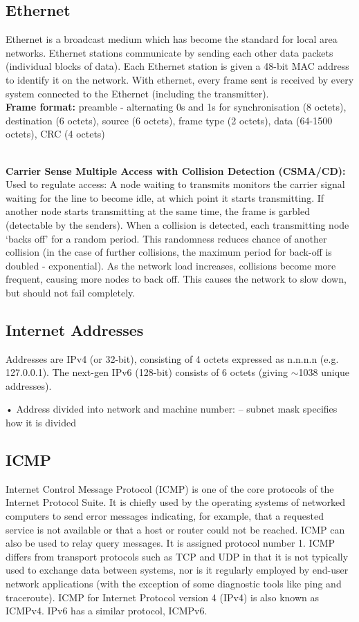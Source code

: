 \documentclass[a4paper,oneside]{report}
\begin{document}
    	\subsection{Ethernet}
    	Ethernet is a broadcast medium which has become the standard for local area networks. Ethernet stations communicate by sending each other data packets (individual blocks of data). Each Ethernet station is given a 48-bit MAC address to identify it on the network. With ethernet, every frame sent is received by every system connected to the Ethernet (including the transmitter).\\
    	
\noindent\textbf{Frame format:}
preamble - alternating 0s and 1s for synchronisation (8 octets), destination (6 octets), source (6 octets), frame type (2 octets), data (64-1500 octets), CRC (4 octets)
    	    	
\ \\ \textbf{Carrier Sense Multiple Access with Collision Detection (CSMA/CD):} Used to regulate access: A node waiting to transmits monitors the carrier signal waiting for the line to become idle, at which point it starts transmitting. If another node starts transmitting at the same time, the frame is garbled (detectable by the senders). When a collision is detected, each transmitting node ‘backs off’ for a random period. This randomness reduces chance of another collision (in the case of further collisions, the maximum period for back-off is doubled - exponential). As the network load increases, collisions become more frequent, causing more nodes to back off. This causes the network to slow down, but should not fail completely.
    	
    	\subsection{Internet Addresses}
    	Addresses are IPv4 (or 32-bit), consisting of 4 octets expressed as n.n.n.n (e.g. 127.0.0.1). The next-gen IPv6 (128-bit) consists of 6 octets (giving $\sim$1038 unique addresses).

• Address divided into network and machine number:
– subnet mask specifies how it is divided
    	
    	\subsection{ICMP}
	Internet Control Message Protocol (ICMP) is one of the core protocols of the Internet Protocol Suite. It is chiefly used by the operating systems of networked computers to send error messages indicating, for example, that a requested service is not available or that a host or router could not be reached. ICMP can also be used to relay query messages. It is assigned protocol number 1. ICMP differs from transport protocols such as TCP and UDP in that it is not typically used to exchange data between systems, nor is it regularly employed by end-user network applications (with the exception of some diagnostic tools like ping and traceroute).
	ICMP for Internet Protocol version 4 (IPv4) is also known as ICMPv4. IPv6 has a similar protocol, ICMPv6.
\end{document}
